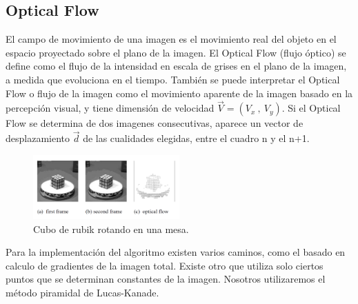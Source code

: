 
\subsection{Optical Flow} 
El campo de movimiento de una imagen es el movimiento real del objeto en el espacio proyectado sobre el plano de la imagen. El Optical Flow (flujo óptico) se define como el flujo de la intensidad en escala de grises en el plano de la imagen, a medida que evoluciona en el tiempo. También se puede interpretar el Optical Flow o flujo de la imagen como el movimiento aparente de la imagen basado en la percepción visual, y tiene dimensión de velocidad $\vec{V}= (V_x \ , \ V_y)$. Si el Optical Flow se determina de dos imagenes consecutivas, aparece un vector de desplazamiento $\vec{d}$ de las cualidades elegidas, entre el cuadro n y el n+1.
\begin{figure}[H]
		\centering
		\includegraphics[width=0.5\textwidth]{Imagenes/opticalflowrubick.png}
		\caption{Cubo de rubik rotando en una mesa.}
		\label{fig:opticalflow1}
\end{figure}
Para la implementación del algoritmo existen varios caminos, como el basado en calculo de gradientes de la imagen total. Existe otro que utiliza solo ciertos puntos que se determinan constantes de la imagen. Nosotros utilizaremos el método piramidal de Lucas-Kanade.

